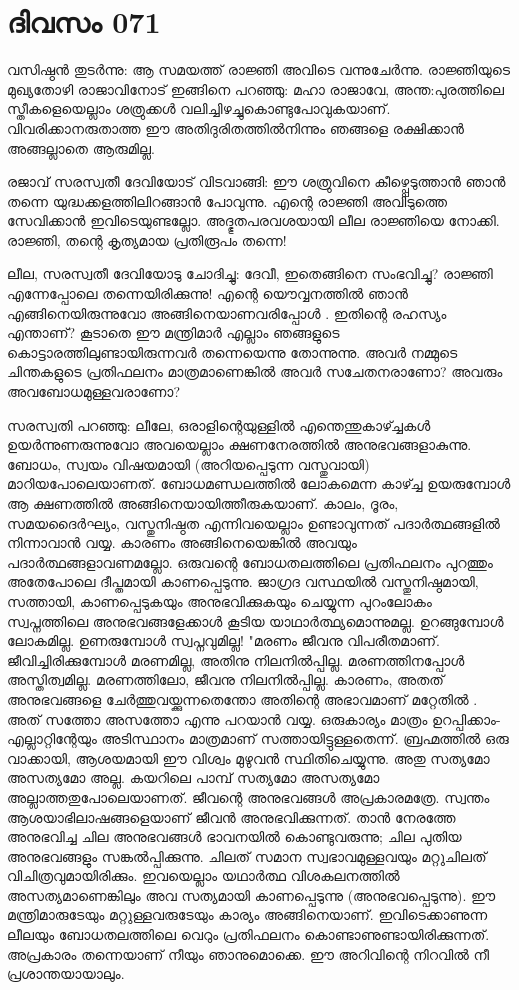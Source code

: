  
\section{ദിവസം 071}


വസിഷ്ഠന്‍ തുടര്‍ന്നു: ആ സമയത്ത്‌ രാജ്ഞി അവിടെ വന്നുചേര്‍ന്നു. രാജ്ഞിയുടെ മുഖ്യതോഴി രാജാവിനോട്‌ ഇങ്ങിനെ പറഞ്ഞു: മഹാ രാജാവേ, അന്ത:പുരത്തിലെ സ്തീകളെയെല്ലാം ശത്രുക്കള്‍ വലിച്ചിഴച്ചുകൊണ്ടുപോവുകയാണ്‌. വിവരിക്കാനരുതാത്ത ഈ അതിദുരിതത്തില്‍നിന്നും ഞങ്ങളെ രക്ഷിക്കാന്‍ അങ്ങല്ലാതെ ആരുമില്ല.

രജാവ്‌ സരസ്വതീ ദേവിയോട്‌ വിടവാങ്ങി: ഈ ശത്രുവിനെ കീഴ്പ്പെടുത്താന്‍ ഞാന്‍ തന്നെ യുദ്ധക്കളത്തിലിറങ്ങാന്‍ പോവുന്നു. എന്റെ രാജ്ഞി അവിടുത്തെ സേവിക്കാന്‍ ഇവിടെയുണ്ടല്ലോ. അദ്ഭുതപരവശയായി ലീല രാജ്ഞിയെ നോക്കി. രാജ്ഞി, തന്റെ കൃത്യമായ പ്രതിരൂപം തന്നെ!

ലീല, സരസ്വതീ ദേവിയോടു ചോദിച്ചു: ദേവീ, ഇതെങ്ങിനെ സംഭവിച്ചു? രാജ്ഞി എന്നേപ്പോലെ തന്നെയിരിക്കുന്നു! എന്റെ യൌവ്വനത്തില്‍ ഞാന്‍ എങ്ങിനെയിരുന്നുവോ അങ്ങിനെയാണവരിപ്പോള്‍ . ഇതിന്റെ രഹസ്യം എന്താണ്‌? കൂടാതെ ഈ മന്ത്രിമാര്‍ എല്ലാം ഞങ്ങളുടെ കൊട്ടാരത്തിലുണ്ടായിരുന്നവര്‍ തന്നെയെന്നു തോന്നുന്നു. അവര്‍ നമ്മുടെ ചിന്തകളുടെ പ്രതിഫലനം മാത്രമാണെങ്കില്‍ അവര്‍ സചേതനരാണോ? അവരും അവബോധമുള്ളവരാണോ?

സരസ്വതി പറഞ്ഞു: ലീലേ, ഒരാളിന്റെയുള്ളില്‍ എന്തെന്തുകാഴ്ച്ചകള്‍ ഉയര്‍ന്നുണരുന്നുവോ അവയെല്ലാം ക്ഷണനേരത്തില്‍ അനുഭവങ്ങളാകുന്നു. ബോധം, സ്വയം വിഷയമായി (അറിയപ്പെടുന്ന വസ്തുവായി) മാറിയപോലെയാണത്‌. ബോധമണ്ഡലത്തില്‍ ലോകമെന്ന കാഴ്ച്ച ഉയരുമ്പോള്‍ ആ ക്ഷണത്തില്‍ അങ്ങിനെയായിത്തീരുകയാണ്‌. കാലം, ദൂരം, സമയദൈര്‍ഘ്യം, വസ്തുനിഷ്ഠത എന്നിവയെല്ലാം ഉണ്ടാവുന്നത്‌ പദാര്‍ത്ഥങ്ങളില്‍ നിന്നാവാന്‍ വയ്യ. കാരണം അങ്ങിനെയെങ്കില്‍ അവയും പദാര്‍ത്ഥങ്ങളാവണമല്ലോ. ഒരുവന്റെ ബോധതലത്തിലെ പ്രതിഫലനം പുറത്തും അതേപോലെ ദീപ്തമായി കാണപ്പെടുന്നു. ജാഗ്രദ വസ്ഥയില്‍ വസ്തുനിഷ്ഠമായി, സത്തായി, കാണപ്പെടുകയും അനുഭവിക്കുകയും ചെയ്യുന്ന പുറംലോകം സ്വപ്നത്തിലെ അനുഭവങ്ങളേക്കാള്‍ കൂടിയ യാഥാര്‍ത്ഥ്യമൊന്നുമല്ല. ഉറങ്ങുമ്പോള്‍ ലോകമില്ല. ഉണരുമ്പോള്‍ സ്വപ്നവുമില്ല! "മരണം ജീവനു വിപരീതമാണ്‌. ജീവിച്ചിരിക്കുമ്പോള്‍ മരണമില്ല, അതിനു നിലനില്‍പ്പില്ല. മരണത്തിനപ്പോള്‍ അസ്തിത്വമില്ല. മരണത്തിലോ, ജീവനു നിലനില്‍പ്പില്ല. കാരണം, അതത്‌ അനുഭവങ്ങളെ ചേര്‍ത്തുവയ്ക്കുന്നതെന്തോ അതിന്റെ അഭാവമാണ്‌ മറ്റേതില്‍ . അത്‌ സത്തോ അസത്തോ എന്നു പറയാന്‍ വയ്യ. ഒരുകാര്യം മാത്രം ഉറപ്പിക്കാം- എല്ലാറ്റിന്റേയും അടിസ്ഥാനം മാത്രമാണ്‌ സത്തായിട്ടുള്ളതെന്ന്. ബ്രഹ്മത്തില്‍ ഒരു വാക്കായി, ആശയമായി ഈ വിശ്വം മുഴുവന്‍ സ്ഥിതിചെയ്യുന്നു. അതു സത്യമോ അസത്യമോ അല്ല. കയറിലെ പാമ്പ്‌ സത്യമോ അസത്യമോ അല്ലാത്തതുപോലെയാണത്‌. ജീവന്റെ അനുഭവങ്ങള്‍ അപ്രകാരമത്രേ. സ്വന്തം ആശയാഭിലാഷങ്ങളെയാണ്‌ ജീവന്‍ അനുഭവിക്കുന്നത്‌. താന്‍ നേരത്തേ അനുഭവിച്ച ചില അനുഭവങ്ങള്‍ ഭാവനയില്‍ കൊണ്ടുവരുന്നു; ചില പുതിയ അനുഭവങ്ങളും സങ്കല്‍പ്പിക്കുന്നു. ചിലത്‌ സമാന സ്വഭാവമുള്ളവയും മറ്റുചിലത്‌ വിചിത്രവുമായിരിക്കും. ഇവയെല്ലാം യഥാര്‍ത്ഥ വിശകലനത്തില്‍ അസത്യമാണെങ്കിലും അവ സത്യമായി കാണപ്പെടുന്നു (അനുഭവപ്പെടുന്നു). ഈ മന്ത്രിമാരുടേയും മറ്റുള്ളവരുടേയും കാര്യം അങ്ങിനെയാണ്‌. ഇവിടെക്കാണുന്ന ലീലയും ബോധതലത്തിലെ വെറും പ്രതിഫലനം കൊണ്ടാണുണ്ടായിരിക്കുന്നത്‌. അപ്രകാരം തന്നെയാണ്‌ നീയും ഞാനുമൊക്കെ. ഈ അറിവിന്റെ നിറവില്‍ നീ പ്രശാന്തയായാലും.
